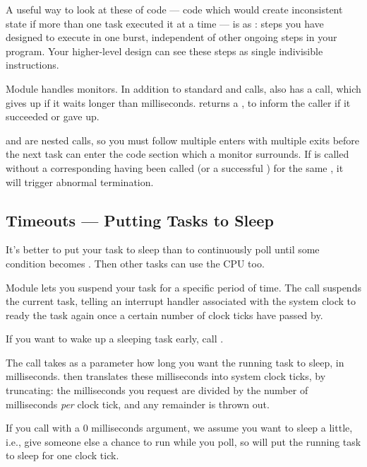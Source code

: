 A useful way to look at these  of code --- code
which would create inconsistent state if more than one task executed it at
a time --- is as : steps you have designed to execute
in one burst, independent of other ongoing steps in your program.  Your
higher-level design can see these steps as single indivisible instructions.

Module  handles monitors.  In addition to standard
 and  calls,  also has a
 call, which gives up if it waits longer than
 milliseconds.   returns a 
,
to inform the caller if it succeeded or gave up.

 and  are nested calls, so you must follow multiple
enters with multiple exits before the next task can enter the code section
which a monitor surrounds.  If  is called without a corresponding
 having been called (or a successful ) for the
same , it will trigger abnormal termination.

\subsection{Timeouts --- Putting Tasks to Sleep}

It's better to put your task to sleep than to continuously poll
until some condition becomes .  Then other tasks can use the
CPU too.

Module  lets you suspend your task for a specific period
of time.  The call  suspends the current task, telling an
interrupt handler associated with the system clock to ready the task again
once a certain number of clock ticks have passed by.

If you want to wake up a sleeping task early, call .

The  call takes as a parameter how long you want the running
task to sleep, in milliseconds.   then translates these
milliseconds into system clock ticks, by truncating: the milliseconds you
request are divided by the number of milliseconds {\em per\/} clock tick,
and any remainder is thrown out.

If you call  with a 0 milliseconds argument, we assume you want
to sleep a little, i.e., give someone else a chance to run while you poll,
so  will put the running task to sleep for one clock tick.

